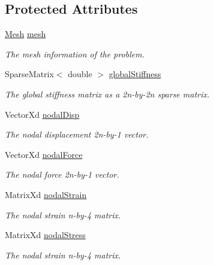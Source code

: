\subsection*{Protected Attributes}
\begin{DoxyCompactItemize}
\item 
\mbox{\label{class_analysis_a34604f343af1a7d0ee2d19f2a905773b}} 
\mbox{\hyperlink{class_mesh}{Mesh}} \mbox{\hyperlink{class_analysis_a34604f343af1a7d0ee2d19f2a905773b}{mesh}}
\begin{DoxyCompactList}\small\item\em The mesh information of the problem. \end{DoxyCompactList}\item 
\mbox{\label{class_analysis_a87256ae6f2ee1d1218b99bf287335fde}} 
Sparse\+Matrix$<$ double $>$ \mbox{\hyperlink{class_analysis_a87256ae6f2ee1d1218b99bf287335fde}{global\+Stiffness}}
\begin{DoxyCompactList}\small\item\em The global stiffness matrix as a 2n-\/by-\/2n sparse matrix. \end{DoxyCompactList}\item 
\mbox{\label{class_analysis_a3e2cbd72b96f13d00c8758631c1d6bc9}} 
Vector\+Xd \mbox{\hyperlink{class_analysis_a3e2cbd72b96f13d00c8758631c1d6bc9}{nodal\+Disp}}
\begin{DoxyCompactList}\small\item\em The nodal displacement 2n-\/by-\/1 vector. \end{DoxyCompactList}\item 
\mbox{\label{class_analysis_aab2110fe7a0fffd9dd738ed9c5f45012}} 
Vector\+Xd \mbox{\hyperlink{class_analysis_aab2110fe7a0fffd9dd738ed9c5f45012}{nodal\+Force}}
\begin{DoxyCompactList}\small\item\em The nodal force 2n-\/by-\/1 vector. \end{DoxyCompactList}\item 
\mbox{\label{class_analysis_a9fa4ad52de8cc42341212d09622949c7}} 
Matrix\+Xd \mbox{\hyperlink{class_analysis_a9fa4ad52de8cc42341212d09622949c7}{nodal\+Strain}}
\begin{DoxyCompactList}\small\item\em The nodal strain n-\/by-\/4 matrix. \end{DoxyCompactList}\item 
\mbox{\label{class_analysis_ae0e69d62aa3cd400b1ae46f430a59cb3}} 
Matrix\+Xd \mbox{\hyperlink{class_analysis_ae0e69d62aa3cd400b1ae46f430a59cb3}{nodal\+Stress}}
\begin{DoxyCompactList}\small\item\em The nodal strain n-\/by-\/4 matrix. \end{DoxyCompactList}\end{DoxyCompactItemize}


